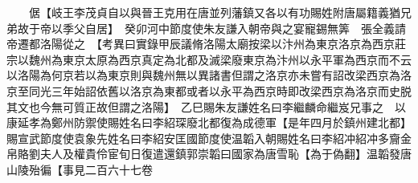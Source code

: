 　　倨【岐王李茂貞自以與晉王克用在唐並列藩鎮又各以有功賜姓附唐屬籍義猶兄弟故于帝以季父自居】　癸卯河中節度使朱友謙入朝帝與之宴寵錫無筭　張全義請帝遷都洛陽從之　【考異曰實錄甲辰議脩洛陽太廟按梁以汴州為東京洛京為西京莊宗以魏州為東京太原為西京真定為北都及滅梁廢東京為汴州以永平軍為西京而不云以洛陽為何京若以為東京則與魏州無以異諸書但謂之洛京亦未嘗有詔改梁西京為洛京至同光三年始詔依舊以洛京為東都或者以永平為西京時即改梁西京為洛京而史脱其文也今無可質正故但謂之洛陽】　乙巳賜朱友謙姓名曰李繼麟命繼岌兄事之　以康延孝為鄭州防禦使賜姓名曰李紹琛廢北都復為成德軍【是年四月於鎮州建北都】　賜宣武節度使袁象先姓名曰李紹安匡國節度使温韜入朝賜姓名曰李紹冲紹冲多齎金帛賂劉夫人及權貴伶宦旬日復遣還鎮郭崇韜曰國家為唐雪恥【為于偽翻】温韜發唐山陵殆徧【事見二百六十七卷